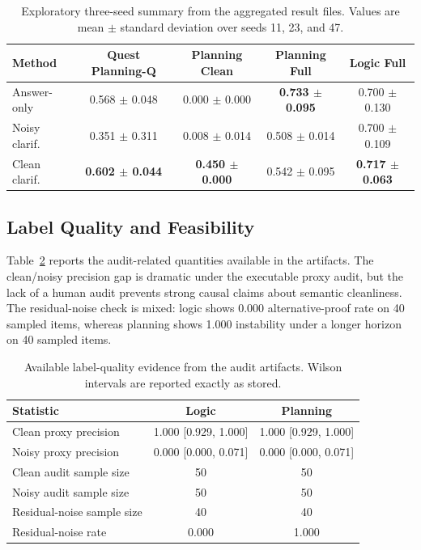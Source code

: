 \begin{table}[t]
\caption{Exploratory three-seed summary from the aggregated result files. Values are mean $\pm$ standard deviation over seeds 11, 23, and 47.}
\label{tab:multiseed}
\centering
\small
\begin{tabular}{lcccc}
\toprule
Method & Quest Planning-Q & Planning Clean & Planning Full & Logic Full \\
\midrule
Answer-only & 0.568 $\pm$ 0.048 & 0.000 $\pm$ 0.000 & \textbf{0.733 $\pm$ 0.095} & 0.700 $\pm$ 0.130 \\
Noisy clarif. & 0.351 $\pm$ 0.311 & 0.008 $\pm$ 0.014 & 0.508 $\pm$ 0.014 & 0.700 $\pm$ 0.109 \\
Clean clarif. & \textbf{0.602 $\pm$ 0.044} & \textbf{0.450 $\pm$ 0.000} & 0.542 $\pm$ 0.095 & \textbf{0.717 $\pm$ 0.063} \\
\bottomrule
\end{tabular}
\end{table}

\subsection{Label Quality and Feasibility}
Table~\ref{tab:labelquality} reports the audit-related quantities available in the artifacts. The clean/noisy precision gap is dramatic under the executable proxy audit, but the lack of a human audit prevents strong causal claims about semantic cleanliness. The residual-noise check is mixed: logic shows 0.000 alternative-proof rate on 40 sampled items, whereas planning shows 1.000 instability under a longer horizon on 40 sampled items.

\begin{table}[t]
\caption{Available label-quality evidence from the audit artifacts. Wilson intervals are reported exactly as stored.}
\label{tab:labelquality}
\centering
\small
\begin{tabular}{lcc}
\toprule
Statistic & Logic & Planning \\
\midrule
Clean proxy precision & 1.000 [0.929, 1.000] & 1.000 [0.929, 1.000] \\
Noisy proxy precision & 0.000 [0.000, 0.071] & 0.000 [0.000, 0.071] \\
Clean audit sample size & 50 & 50 \\
Noisy audit sample size & 50 & 50 \\
Residual-noise sample size & 40 & 40 \\
Residual-noise rate & 0.000 & 1.000 \\
\bottomrule
\end{tabular}
\end{table}

